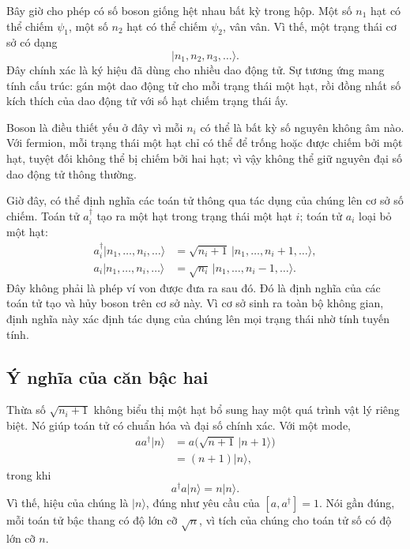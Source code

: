 Bây giờ cho phép có số boson giống hệt nhau bất kỳ trong hộp. Một số \(n_1\) hạt có thể chiếm \(\psi_1\), một số \(n_2\) hạt có thể chiếm \(\psi_2\), vân vân. Vì thế, một trạng thái cơ sở có dạng
\begin{equation}
|n_1,n_2,n_3,\ldots\rangle.
\end{equation}
Đây chính xác là ký hiệu đã dùng cho nhiều dao động tử. Sự tương ứng mang tính cấu trúc: gán một dao động tử cho mỗi trạng thái một hạt, rồi đồng nhất số kích thích của dao động tử với số hạt chiếm trạng thái ấy.

Boson là điều thiết yếu ở đây vì mỗi \(n_i\) có thể là bất kỳ số nguyên không âm nào. Với fermion, mỗi trạng thái một hạt chỉ có thể để trống hoặc được chiếm bởi một hạt, tuyệt đối không thể bị chiếm bởi hai hạt; vì vậy không thể giữ nguyên đại số dao động tử thông thường.

Giờ đây, có thể định nghĩa các toán tử thông qua tác dụng của chúng lên cơ sở số chiếm. Toán tử \(a_i^\dagger\) tạo ra một hạt trong trạng thái một hạt \(i\); toán tử \(a_i\) loại bỏ một hạt:
\begin{align}
a_i^\dagger|n_1,\ldots,n_i,\ldots\rangle
&=\sqrt{n_i+1}\,|n_1,\ldots,n_i+1,\ldots\rangle, \\
a_i|n_1,\ldots,n_i,\ldots\rangle
&=\sqrt{n_i}\,|n_1,\ldots,n_i-1,\ldots\rangle.
\end{align}
Đây không phải là phép ví von được đưa ra sau đó. Đó là định nghĩa của các toán tử tạo và hủy boson trên cơ sở này. Vì cơ sở sinh ra toàn bộ không gian, định nghĩa này xác định tác dụng của chúng lên mọi trạng thái nhờ tính tuyến tính.

\begin{classroomqa}\end{classroomqa}

\subsection{Ý nghĩa của căn bậc hai}

Thừa số \(\sqrt{n_i+1}\) không biểu thị một hạt bổ sung hay một quá trình vật lý riêng biệt. Nó giúp toán tử có chuẩn hóa và đại số chính xác. Với một mode,
\begin{align}
a a^\dagger|n\rangle
&=a\bigl(\sqrt{n+1}\,|n+1\rangle\bigr) \\
&=(n+1)|n\rangle,
\end{align}
trong khi
\begin{equation}
a^\dagger a|n\rangle=n|n\rangle.
\end{equation}
Vì thế, hiệu của chúng là \(|n\rangle\), đúng như yêu cầu của \([a,a^\dagger]=1\). Nói gần đúng, mỗi toán tử bậc thang có độ lớn cỡ \(\sqrt n\), vì tích của chúng cho toán tử số có độ lớn cỡ \(n\).

